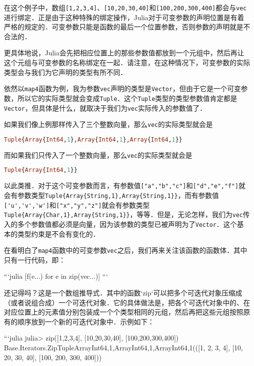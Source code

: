 在这个例子中，数组\verb|[1,2,3,4]|、\verb|[10,20,30,40]|和\verb|[100,200,300,400]|都会与\verb|vec|进行绑定．正是由于这种特殊的绑定操作，Julia对于可变参数的声明位置是有着严格的规定的．可变参数只能是函数的最后一个位置参数，否则参数的声明就是不合法的．

更具体地说，Julia会先把相应位置上的那些参数值都放到一个元组中，然后再让这个元组与可变参数的名称绑定在一起．请注意，在这种情况下，可变参数的实际类型会与我们为它声明的类型有所不同．

依然以\verb|map4|函数为例，我为参数\verb|vec|声明的类型是\verb|Vector|，但由于它是一个可变参数，所以它的实际类型就会变成\verb|Tuple|．这个\verb|Tuple|类型的类型参数值肯定都是\verb|Vector|，但具体是什么，就取决于我们为\verb|vec|实际传入的参数值了．

如果我们像上例那样传入了三个整数向量，那么\verb|vec|的实际类型就会是

\begin{lstlisting}[language=julia]
Tuple{Array{Int64,1},Array{Int64,1},Array{Int64,1}}
\end{lstlisting}

而如果我们只传入了一个整数向量，那么\verb|vec|的实际类型就会是

\begin{lstlisting}[language=julia]
Tuple{Array{Int64,1}}
\end{lstlisting}

以此类推．对于这个可变参数而言，有参数值\verb|["a","b","c"]|和\verb|["d","e","f"]|就会有参数类型\verb|Tuple{Array{String,1},Array{String,1}}|，而有参数值\verb|['u','v','w']|和\verb|["x","y","z"]|就会有参数类型\verb|Tuple{Array{Char,1},Array{String,1}}|，等等．但是，无论怎样，我们为\verb|vec|传入的多个参数值都必须是向量，因为该参数的类型已被声明为了\verb|Vector|．这个基本的类型约束是不会有变化的．

在看明白了\verb|map4|函数中的可变参数\verb|vec|之后，我们再来关注该函数的函数体．其中只有一行代码，即：

```julia
[f(e...) for e in zip(vec...)]
```

还记得吗？这是一个数组推导式．其中的函数`zip`可以把多个可迭代对象压缩成（或者说组合成）一个可迭代对象．它的具体做法是，把各个可迭代对象中的、在对应位置上的元素值分别包装成一个个类型相同的元组，然后再把这些元组按照原有的顺序放到一个新的可迭代对象中．示例如下：

```julia
julia> zip([1,2,3,4], [10,20,30,40], [100,200,300,400])
Base.Iterators.Zip{Tuple{Array{Int64,1},Array{Int64,1},Array{Int64,1}}}(([1, 2, 3, 4], [10, 20, 30, 40], [100, 200, 300, 400]))

